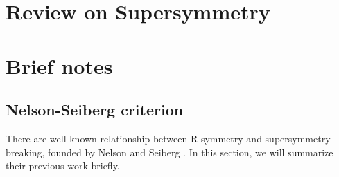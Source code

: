 \documentclass[a4paper,pdftex,10pt]{report}
\begin{document}
\maketitle

\tableofcontents

\clearpage
\chapter{Review on Supersymmetry}



















\clearpage
\appendix
\chapter{Brief notes}


\section{Nelson-Seiberg criterion}

There are well-known relationship between R-symmetry and supersymmetry breaking, founded by Nelson and Seiberg \cite{Nelson:1993nf}. In this section, we will summarize their previous work briefly.
















\clearpage



\nocite{Nelson:1993nf}
\nocite{Martin:1997ns}

\end{document}
